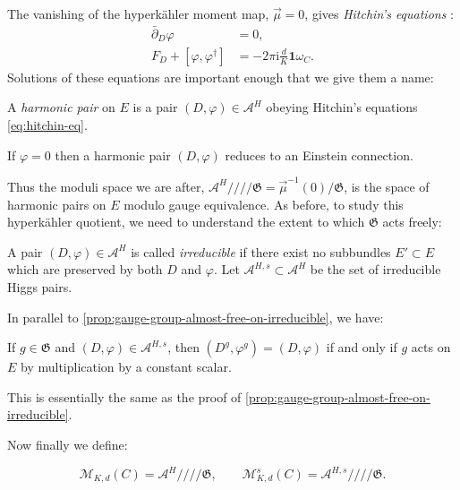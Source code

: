 \documentclass[12pt,letterpaper,reqno]{article}
\numberwithin{equation}{section}
\newcommand{\fG}{{\mathfrak G}}
\newcommand{\cM}{\ensuremath{\mathcal M}}
\newcommand{\cA}{\ensuremath{\mathcal A}}
\newcommand{\hk}{hyperk\"ahler\xspace}
\newcommand{\hkq}{/\!\!/\!\!/\!\!/}
\newcommand{\I}{{\mathrm i}}
\newcommand\bid{{\mathbf 1}}
\newcommand{\ti}[1]{\textit{#1}}
\begin{document}
The vanishing of the \hk moment map, $\vec\mu = 0$, gives \ti{Hitchin's equations} \cite{MR89a:32021}:
\begin{subequations} \label{eq:hitchin-eq}
\begin{align}
\bar\partial_D \varphi &= 0, \\
F_D + [\varphi,\varphi^\dagger] &= -2 \pi \I \frac{d}{K} \bid \omega_C.
\end{align}
\end{subequations}
Solutions of these equations are important enough that we give them a name:
\begin{defn}
A \ti{harmonic pair} on $E$ is a pair $(D,\varphi) \in \cA^H$
obeying Hitchin's equations \eqref{eq:hitchin-eq}.
\end{defn}

If $\varphi = 0$ then a harmonic pair $(D,\varphi)$ reduces to an
Einstein connection.

Thus the moduli space we are after, $\cA^H \hkq \fG = \vec\mu^{-1}(0) / \fG$,
is the space of harmonic pairs on $E$ modulo gauge equivalence.
As before, to study this \hk quotient,
we need to understand the extent to which
$\fG$ acts freely:

\begin{defn} A pair $(D,\varphi) \in \cA^H$
is called \ti{irreducible} if there exist no subbundles $E' \subset E$
which are preserved by both $D$ and $\varphi$. Let $\cA^{H,s} \subset \cA^H$
be the set of irreducible Higgs pairs.
\end{defn}

In parallel to \autoref{prop:gauge-group-almost-free-on-irreducible},
we have:
\begin{prop}
If $g \in \fG$ and $(D,\varphi) \in \cA^{H,s}$, then
$(D^g,\varphi^g) = (D,\varphi)$
if and only if $g$ acts on $E$ by multiplication by a constant scalar.
\end{prop}
\begin{pf} This is essentially the same as the proof of
\autoref{prop:gauge-group-almost-free-on-irreducible}.
\end{pf}

Now finally we define:
\begin{defn}
\begin{equation}
  \cM_{K,d}(C) = \cA^H \hkq \fG, \qquad \cM^s_{K,d}(C) = \cA^{H,s} \hkq \fG.
\end{equation}
\end{defn}
\end{document}
